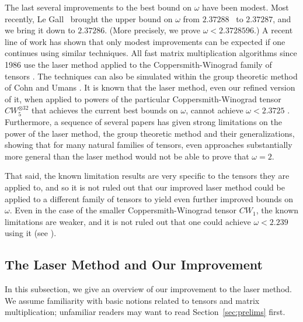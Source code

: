 \PassOptionsToPackage{shortlabels}{enumitem}\documentclass[10pt,a4paper]{article}
\begin{document}
The last several improvements to the best bound on $\omega$ have been modest. Most recently, Le Gall~\cite{legall} brought the upper bound on $\omega$ from $2.37288$~\cite{v12} to $2.37287$, and we bring it down to $2.37286$. (More precisely, we prove $\omega < 2.3728596$.)
A recent line of work has shown that only modest improvements can be expected if one continues using similar techniques. All fast matrix multiplication algorithms since 1986 use the laser method applied to the Coppersmith-Winograd family of tensors \cite{coppersmith}. The techniques can also be simulated within the group theoretic method of Cohn and Umans \cite{cohn2003group,cohn2005group,cohn2013fast}. 
It is known that the laser method, even our refined version of it, when applied to powers of the particular Coppersmith-Winograd tensor $CW^{\otimes 32}_5$ that achieves the current best bounds on $\omega$, cannot achieve $\omega<2.3725$ \cite{ambainis}. 
Furthermore, a sequence of several papers \cite{ambainis,sunfl,blasiak,blasiak2017groups,almanitcs,aw2,Alman19,ChristandlVZ19,blaser2020slice,wojtala2023irreversibility,blasiak2023matrix} has given strong limitations on the power of the laser method, the group theoretic method and their generalizations, showing that for many natural families of tensors, even approaches substantially more general than the laser method would not be able to prove that $\omega=2$. 


That said, the known limitation results are very specific to the tensors they are applied to, and so it is not ruled out that our improved laser method could be applied to a different family of tensors to yield even further improved bounds on $\omega$.
Even in the case of the smaller Coppersmith-Winograd tensor $CW_1$, the known limitations are weaker, and it is not ruled out that one could achieve $\omega<2.239$ using it (see \cite[Table 1]{ambainis}). 


\subsection{The Laser Method and Our Improvement}

In this subsection, we give an overview of our improvement to the laser method. We assume familiarity with basic notions related to tensors and matrix multiplication; unfamiliar readers may want to read Section~\ref{sec:prelims} first.
\end{document}
